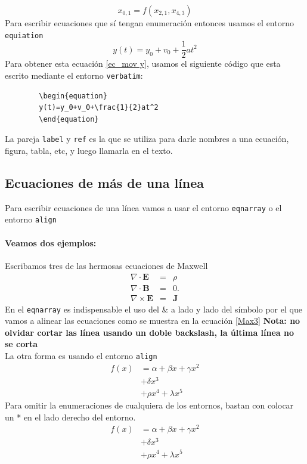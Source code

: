 \documentclass[onecolumn]{article} %
\begin{document}
	$$x_{0,1}=f(x_{2,1},x_{4,3})$$
	Para escribir ecuaciones que sí tengan enumeración entonces usamos el entorno \verb+equiation+
\begin{equation}
	\label{ec_mov y} %
	y(t)=y_0+v_0+\frac{1}{2}at^2
\end{equation}
Para obtener esta ecuación \ref{ec_mov y}, usamos el siguiente código que esta escrito mediante el entorno \verb+verbatim+:
	\begin{verbatim}
		\begin{equation}
		y(t)=y_0+v_0+\frac{1}{2}at^2
		\end{equation}
	\end{verbatim}
La pareja \verb+label+ y \verb+ref+ es la que se utiliza para darle nombres a una ecuación, figura, tabla, etc, y luego llamarla en el texto.
	\subsection{Ecuaciones de más de una línea}
	Para escribir ecuaciones de una línea vamos a usar el entorno \verb+eqnarray+ o el entorno \verb+align+ 
\paragraph{Veamos dos ejemplos:}
Escribamos tres de las hermosas ecuaciones de Maxwell
\begin{eqnarray}
	\label{Max3}
	\nabla\cdot\mathbf{E} &=&\rho \nonumber\\
	\nabla\cdot\mathbf{B} &=&0. \\
	\nabla\times\mathbf{E} &=& \mathbf J \nonumber
\end{eqnarray}
En el \verb+eqnarray+ es indispensable el uso del \& a lado y lado del símbolo por el que vamos a alinear las ecuaciones como se muestra en la ecuación \ref{Max3}
{\bf Nota: no olvidar cortar las línea usando un doble backslash, la última línea no se corta}
\\
La otra forma es usando el entorno \verb+align+
\begin{align}
f(x)&=\alpha + \beta x + \gamma x^2 \nonumber \\ 
&+\delta x^3  \\
&+\rho x^4+ \lambda x^5 \nonumber
\end{align}
Para omitir la enumeraciones de cualquiera de los entornos, bastan con colocar un * en el lado derecho del entorno.
\begin{align*}
f(x)&=\alpha + \beta x + \gamma x^2 \\ 
&+\delta x^3  \\
&+\rho x^4+ \lambda x^5 
\end{align*}
\end{document}
